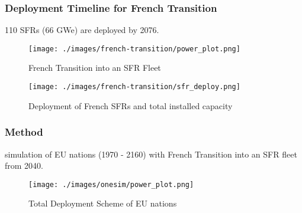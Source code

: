 \begin{frame}
	\frametitle{Deployment Timeline for French Transition}
	110 \glspl{SFR} (66 GWe) are deployed by 2076.
	\begin{figure}[htbp!]
	\begin{minipage}[b]{.45\linewidth}
        \begin{center}
                \texttt{[image: ./images/french-transition/power\_plot.png]}
        \end{center}
        \caption{French Transition into an SFR Fleet}
        \label{fig:sfr_num}
	\end{minipage}
	\hspace{.5cm}
	\begin{minipage}[b]{.45\linewidth}
		\centering
		\texttt{[image: ./images/french-transition/sfr\_deploy.png]}
		\caption{Deployment of French \glspl{SFR} and total installed capacity}
		\label{fig:dep}
	\end{minipage}
\end{figure}
\end{frame}



\begin{frame}
    \frametitle{Method}
    \Cyclus simulation of \gls{EU} nations (1970 - 2160) with 
    French Transition into an \gls{SFR} fleet from 2040.

\begin{figure}[htbp!]
        \begin{center}
                \texttt{[image: ./images/onesim/power\_plot.png]}
        \end{center}
        \caption{Total Deployment Scheme of \gls{EU} nations}
        \label{fig:eu_dep}

\end{figure}

\end{frame}